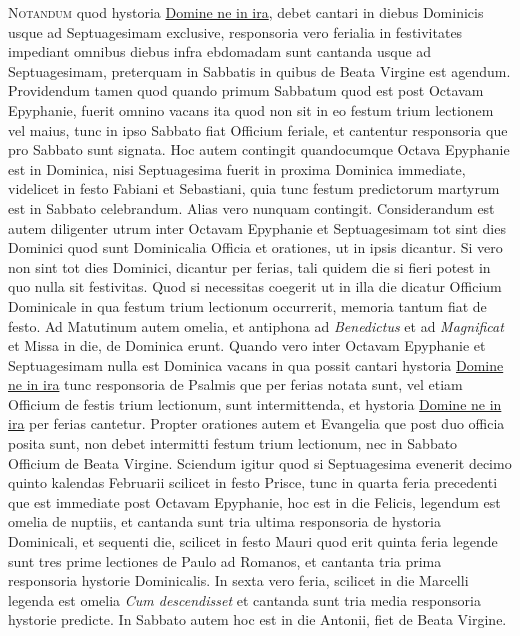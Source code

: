 \begin{multicols*}{2}
\lettrine[lines=2]{\zallmancaps \color{Red} N}{otandum} quod hystoria \hyperlink{domine-ne-in-ira}{Domine ne in ira}, debet cantari in diebus Dominicis usque ad Septuagesimam exclusive, responsoria vero ferialia in festivitates impediant omnibus diebus infra ebdomadam sunt cantanda usque ad Septuagesimam, preterquam in Sabbatis in quibus de Beata Virgine est agendum.
Providendum tamen quod quando primum Sabbatum quod est post Octavam Epyphanie, fuerit omnino vacans ita quod non sit in eo festum trium lectionem vel maius, tunc in ipso Sabbato fiat Officium feriale, et cantentur responsoria que pro Sabbato sunt signata.
Hoc autem contingit quandocumque Octava Epyphanie est in Dominica, nisi Septuagesima fuerit in proxima Dominica immediate, videlicet in festo Fabiani et Sebastiani, quia tunc festum predictorum martyrum est in Sabbato celebrandum. Alias vero nunquam contingit.
Considerandum est autem diligenter utrum inter Octavam Epyphanie et Septuagesimam tot sint dies Dominici quod sunt Dominicalia Officia et orationes, ut in ipsis dicantur. Si vero non sint tot dies Dominici, dicantur per ferias, tali quidem die si fieri potest in quo nulla sit festivitas. Quod si necessitas coegerit ut in illa die dicatur Officium Dominicale in qua festum trium lectionum occurrerit, memoria tantum fiat de festo.
Ad Matutinum autem omelia, et antiphona ad \textit{Benedictus} et ad \textit{Magnificat} et Missa in die, de Dominica erunt.
Quando vero inter Octavam Epyphanie et Septuagesimam nulla est Dominica vacans in qua possit cantari hystoria \hyperlink{domine-ne-in-ira}{Domine ne in ira} tunc responsoria de Psalmis que per ferias notata sunt, vel etiam Officium de festis trium lectionum, sunt intermittenda, et hystoria \hyperlink{domine-ne-in-ira}{Domine ne in ira} per ferias cantetur.
Propter orationes autem et Evangelia que post duo officia posita sunt, non debet intermitti festum trium lectionum, nec in Sabbato Officium de Beata Virgine.
Sciendum igitur quod si Septuagesima evenerit decimo quinto kalendas Februarii scilicet in festo Prisce, tunc in quarta feria precedenti que est immediate post Octavam Epyphanie, hoc est in die Felicis, legendum est omelia de nuptiis, et cantanda sunt tria ultima responsoria de hystoria Dominicali, et sequenti die, scilicet in festo Mauri quod erit quinta feria legende sunt tres prime lectiones de Paulo ad Romanos, et cantanta tria prima responsoria hystorie Dominicalis. In sexta vero feria, scilicet in die Marcelli legenda est omelia \textit{Cum descendisset} et cantanda sunt tria media responsoria hystorie predicte. In Sabbato autem hoc est in die Antonii, fiet de Beata Virgine.

\end{multicols*}

